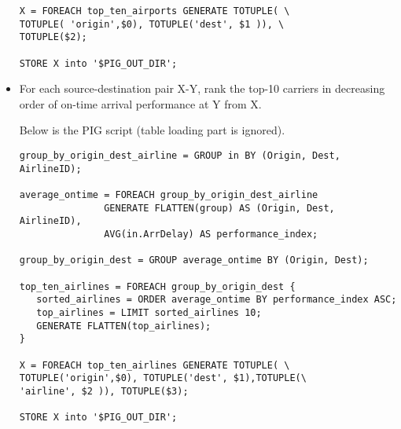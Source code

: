 \documentclass[fontsize=11pt,paper=a4,pagesize=auto]{report}
\begin{document}
\begin{itemize}
\begin{verbatim}
X = FOREACH top_ten_airports GENERATE TOTUPLE( \
TOTUPLE( 'origin',$0), TOTUPLE('dest', $1 )), \
TOTUPLE($2);

STORE X into '$PIG_OUT_DIR'; 
\end{verbatim}
\normalsize

\item For each source-destination pair X-Y, rank the top-10 carriers in decreasing order of on-time arrival performance at Y from X.

Below is the PIG script (table loading part is ignored). 
\small\begin{verbatim}
group_by_origin_dest_airline = GROUP in BY (Origin, Dest, AirlineID);

average_ontime = FOREACH group_by_origin_dest_airline
               GENERATE FLATTEN(group) AS (Origin, Dest, AirlineID),
               AVG(in.ArrDelay) AS performance_index;

group_by_origin_dest = GROUP average_ontime BY (Origin, Dest);

top_ten_airlines = FOREACH group_by_origin_dest {
   sorted_airlines = ORDER average_ontime BY performance_index ASC;
   top_airlines = LIMIT sorted_airlines 10;
   GENERATE FLATTEN(top_airlines);
}

X = FOREACH top_ten_airlines GENERATE TOTUPLE( \
TOTUPLE('origin',$0), TOTUPLE('dest', $1),TOTUPLE(\
'airline', $2 )), TOTUPLE($3);

STORE X into '$PIG_OUT_DIR';
\end{verbatim}
\normalsize


\end{itemize}
\end{document}
